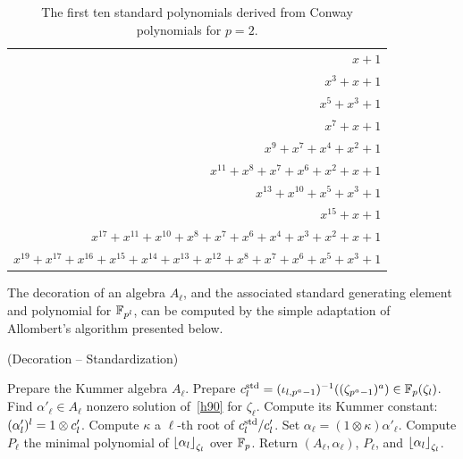 \documentclass{sig-alternate}
\begin{document}
\begin{table}[h]
  \centering
  \small
  \begin{tabular}[h]{r}
    $x+1$\\
    $x^3+x+1$\\
    $x^5+x^3+1$\\
    $x^7+x+1$\\
    $x^9+x^7+x^4+x^2+1$   \\
    $x^{11}+x^8+x^7+x^6+x^2+x+1$\\
    $x^{13}+x^{10}+x^5+x^3+1$\\
    $x^{15}+x+1$ \\
    \tiny
    $x^{17}+x^{11}+x^{10}+x^8+ x^7+x^6+x^4+x^3+x^2+x+1$ \\
    \tiny
    $x^{19}+x^{17}+x^{16}+x^{15}+x^{14}+x^{13}+x^{12}+x^8+x^7+x^6+x^5+x^3+1$
  \end{tabular}
  
  \caption{The first ten standard polynomials derived from Conway
    polynomials for $p=2$.}
  \label{tab:std-polys}
\end{table}


The decoration of an algebra $A_\ell$, and the associated standard
generating element and polynomial for $\mathbb{F}_{p^l}$, can be computed by the simple adaptation of
Allombert's algorithm presented below. %

\begin{algorithm}
  \caption{(Decoration -- Standardization)}
  \label{algo:decoration}
  \begin{algorithmic}[1]
  \STATE Prepare the Kummer algebra $A_\ell$.
  \STATE Prepare $c^{\mathrm{std}}_l=({\iota_{{l},{p^a-1}}})^{-1}((\zeta_{p^a-1})^a)\in\mathbb{F}_p(\zeta_l)$.
  \STATE Find $\alpha'_\ell\in A_\ell$ nonzero solution of~\eqref{h90} for $\zeta_\ell$.
  \STATE Compute its Kummer constant: $(\alpha'_l)^l=1\otimes c'_l$.
  \STATE Compute $\kappa$ a $\ell$-th root of $c^{\mathrm{std}}_l/c'_l$.
  \STATE Set $\alpha_{\ell}=(1\otimes\kappa)\alpha'_\ell$.
  \STATE Compute $P_\ell$ the minimal polynomial of $\left\lfloor \alpha_{l} \right\rfloor_{\zeta_l}$ over $\mathbb{F}_{p}$.
  \STATE Return $(A_\ell,\alpha_\ell)$, $P_\ell$, and $\left\lfloor \alpha_l \right\rfloor_{\zeta_l}$.
  \end{algorithmic}
\end{algorithm}
\end{document}
